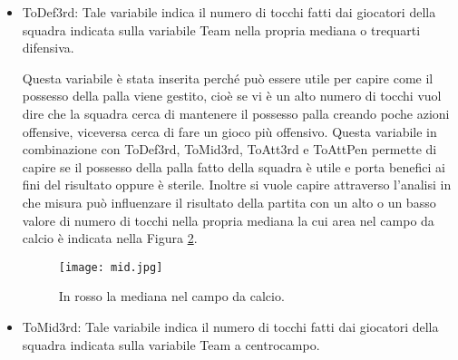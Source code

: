 \begin{itemize}
	Questa variabile è stata inserita perché può essere utile per capire come il possesso della palla viene gestito, cioè se vi è un alto numero di tocchi vuol dire che la squadra subisce molto la pressione della squadra avversaria, viceversa cerca di fare un gioco più offensivo. Questa variabile in combinazione con \textsf{ToDef3rd}, \textsf{ToMid3rd}, \textsf{ToAtt3rd} e \textsf{ToAttPen} permette di capire se il possesso della palla fatto della squadra è utile e porta benefici ai fini del risultato oppure è sterile. Inoltre si vuole capire attraverso l'analisi in che misura può influenzare il risultato della partita con un alto o un basso valore di numero di tocchi nella propria area di rigore la cui area nel campo da calcio è indicata nella Figura \ref{fig:penalty}.
	
	\begin{figure}[!ht]
		\begin{center}
			\texttt{[image: rigore.jpg]}
			\caption{In rosso l'area di rigore in un campo da calcio.} 
			\label{fig:penalty}
		\end{center}
	\end{figure}
	

	\item \textsf{ToDef3rd}: Tale variabile indica il numero di tocchi fatti dai giocatori della squadra indicata sulla variabile \textsf{Team} nella propria mediana o trequarti difensiva. 
	
	Questa variabile è stata inserita perché può essere utile per capire come il possesso della palla viene gestito, cioè se vi è un alto numero di tocchi vuol dire che la squadra cerca di mantenere il possesso palla creando poche azioni offensive, viceversa cerca di fare un gioco più offensivo. Questa variabile in combinazione con \textsf{ToDef3rd}, \textsf{ToMid3rd}, \textsf{ToAtt3rd} e \textsf{ToAttPen} permette di capire se il possesso della palla fatto della squadra è utile e porta benefici ai fini del risultato oppure è sterile. Inoltre si vuole capire attraverso l'analisi in che misura può influenzare il risultato della partita con un alto o un basso valore di numero di tocchi nella propria mediana la cui area nel campo da calcio è indicata nella Figura \ref{fig:def}.
	
		\begin{figure}[!ht]
		\begin{center}
			\texttt{[image: mid.jpg]}
			\caption{In rosso la mediana nel campo da calcio.} 
			\label{fig:def}
		\end{center}
	\end{figure}
	\item \textsf{ToMid3rd}: Tale variabile indica il numero di tocchi fatti dai giocatori della squadra indicata sulla variabile \textsf{Team} a centrocampo. 
	

\end{itemize}
